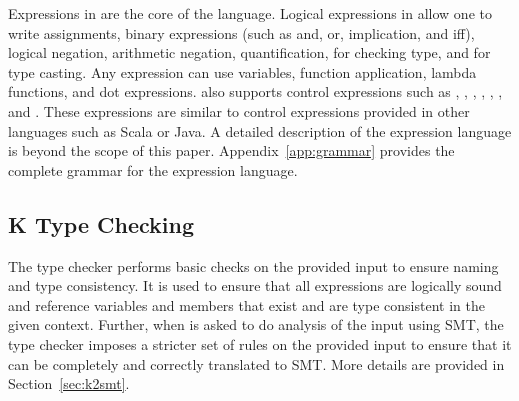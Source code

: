 Expressions in \Klang{} are the core of the language. Logical
expressions in \Klang{} allow one to write assignments, binary
expressions (such as and, or, implication, and iff), logical negation,
arithmetic negation, quantification,  for checking type, and
 for type casting. Any expression can use variables, function
application, lambda functions, and dot expressions. \Klang{} also
supports control expressions such as ,
, , , , ,
and . These expressions are similar to control
expressions provided in other languages such as Scala or Java. A
detailed description of the expression language is beyond the scope of
this paper. Appendix~\ref{app:grammar} provides the complete grammar
for the expression language.

\subsection{K Type Checking}

The \Klang{} type checker performs basic checks on the provided input
to ensure naming and type consistency. It is used to ensure that all
expressions are logically sound and reference variables and members
that exist and are type consistent in the given context. Further, when
\Klang{} is asked to do analysis of the input using SMT, the type
checker imposes a stricter set of rules on the provided input to
ensure that it can be completely and correctly translated to SMT. More
details are provided in Section~\ref{sec:k2smt}.
